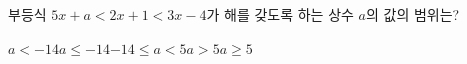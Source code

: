 부등식 $5x+a<2x+1<3x-4$가 해를 갖도록 하는 상수 $a$의 값의 범위는?
\begin{choicesii}{$a<-14$}{$a\le -14$}{$-14\le a<5$}{$a>5$}{$a\ge 5$}\end{choicesii}
